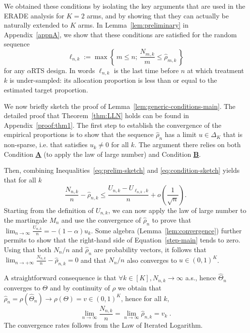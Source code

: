 We obtained these conditions by isolating the key arguments that are used in the ERADE analysis for $K=2$ arms, and by showing that they can actually be naturally extended to $K$ arms. In Lemma~\ref{lem:preliminary} in Appendix~\ref{appnA}, we show that these conditions are satisfied for the random sequence
\[\ell_{n,k} := \max \left\{\, m \leq n ; \, \frac{N_{m,k}}{m} \leq \hat{\rho}_{m,k}  \,\right\}\]
for any $\alpha$RTS design. In words $\ell_{n,k}$ is the last time before \(n\) at which treatment \(k\) is under-sampled: its allocation proportion is less than or equal to the estimated target proportion.

\smallskip

We now briefly sketch the proof of Lemma~\ref{lem:generic-conditions-main}. The detailed proof that Theorem~\ref{thm:LLN} holds can be found in Appendix~\ref{proof:thm1}. The first step to establish the convergence of the empirical proportions is to show that the sequence $\hat{\rho}_n$ has a limit $u \in \Delta_K$ that is non-sparse, i.e. that satisfies $u_k \neq 0$ for all $k$. The argument there relies on both Condition \hyperlink{CA}{\textbf{A}} (to apply the law of large number) and Condition \hyperlink{CB}{\textbf{B}}.

Then, combining Inequalities~\eqref{eq:prelim-sketch} and \eqref{eq:condition-sketch} yields that for all $k$
\begin{equation}\label{step-main}\frac{N_{n,k}}{n} - \hat{\rho}_{n,k} \leq \frac{U_{n,k}- U_{\ell_{n,k},k}}{n} + o\left(\frac{1}{\sqrt{n}}\right).\end{equation}
Starting from the definition of $U_{n,k}$, we can now apply the law of large number to the martingale $M_n$ and use the convergence of $\hat{\rho}_{n}$ to prove that $\lim_{n\rightarrow \infty} \frac{U_{n,k}}{n} = -(1-\alpha)u_k$. Some algebra (Lemma~\ref{lem:convergence}) further permits to show that the right-hand side of Equation~\eqref{step-main} tends to zero. Using that both $N_n/n$ and $\hat{\rho}_n$ are probability vectors, it follows that $\lim_{n\rightarrow +\infty} \frac{N_{n,k}}{n} - \hat{\rho}_{n,k} = 0$ and that ${N_{n}}/{n}$ also converges to $u \in (0,1)^K$.

A straightforward consequence is that $\forall k \in [K], N_{n,k} \to \infty$ a.s., hence $\hat{\Theta}_n$ converges to $\Theta$ and by continuity of \(\rho\) we obtain that \(\hat{\rho}_n = \rho(\hat{\Theta}_n) \to \rho(\Theta) = v \in (0,1)^K\), hence for all $k$,
	\[
	\lim_{n \to \infty} \frac{N_{n,k}}{n} = \lim_{n \to \infty} \hat{\rho}_{n,k} = v_k\;.
	\]
	The convergence rates follows from the Law of Iterated Logarithm.

